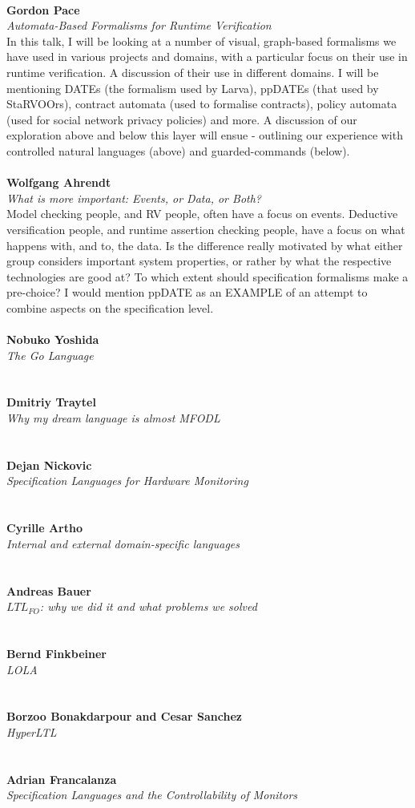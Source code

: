 \documentclass{article}
\newcommand{\talk}[3]{
\vspace{0.5em}~\\
\noindent
\textbf{#1}\\ 
\noindent\emph{#2}\\ 
\noindent#3\\
}
\begin{document}
\talk{Gordon Pace}{Automata-Based Formalisms for Runtime Verification}{In this talk, I will be looking at a number of visual, graph-based formalisms we have used in various projects and domains, with a particular focus on their use in runtime verification. A discussion of their use in different domains. I will be mentioning DATEs (the formalism used by Larva), ppDATEs (that used by StaRVOOrs), contract automata (used to formalise contracts), policy automata (used for social network privacy policies) and more. A discussion of our exploration above and below this layer will ensue - outlining our experience with controlled natural languages (above) and guarded-commands (below).}
\talk{Wolfgang Ahrendt}{What is more important: Events, or Data, or Both?}{Model checking people, and RV people, often have a focus on events. Deductive versification people, and runtime assertion checking people, have a focus on what happens with, and to, the data. Is the difference really motivated by what either group considers important system properties, or rather by what the respective technologies are good at? To which extent should specification formalisms make a pre-choice? I would mention ppDATE as an EXAMPLE of an attempt to combine aspects on the specification level.}
\talk{Nobuko Yoshida}{The Go Language}{}
\talk{Dmitriy Traytel}{Why my dream language is almost MFODL}{}
\talk{Dejan Nickovic}{Specification Languages for Hardware Monitoring}{}
\talk{Cyrille Artho}{Internal and external domain-specific languages}{}
\talk{Andreas Bauer}{$LTL_{FO}$: why we did it and what problems we solved}{}
\talk{Bernd Finkbeiner}{LOLA}{}
\talk{Borzoo Bonakdarpour and Cesar Sanchez}{HyperLTL}{}
\talk{Adrian Francalanza}{Specification Languages and the Controllability of Monitors}{}
\end{document}
